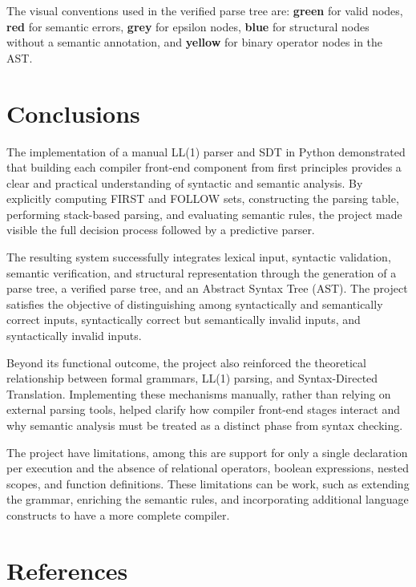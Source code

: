\documentclass[letterpaper,12pt,oneside]{article}
\begin{document}
The visual conventions used in the verified parse tree are:
\textbf{green} for valid nodes, \textbf{red} for semantic errors, \textbf{grey}
for epsilon nodes, \textbf{blue} for structural nodes without a semantic annotation,
and \textbf{yellow} for binary operator nodes in the AST.

\section{Conclusions}

The implementation of a manual LL(1) parser and SDT in Python demonstrated that
building each compiler front-end component from first principles provides a clear
and practical understanding of syntactic and semantic analysis. By explicitly
computing FIRST and FOLLOW sets, constructing the parsing table, performing
stack-based parsing, and evaluating semantic rules, the project made visible the
full decision process followed by a predictive parser.

The resulting system successfully integrates lexical input, syntactic validation,
semantic verification, and structural representation through the generation of a
parse tree, a verified parse tree, and an Abstract Syntax Tree (AST). The project satisfies the objective of distinguishing among syntactically
and semantically correct inputs, syntactically correct but semantically invalid
inputs, and syntactically invalid inputs.

Beyond its functional outcome, the project also reinforced the theoretical
relationship between formal grammars, LL(1) parsing, and Syntax-Directed
Translation. Implementing these mechanisms manually, rather than relying on
external parsing tools, helped clarify how compiler front-end stages interact and why semantic analysis must be treated as a distinct phase from syntax checking.

The project have limitations, among this are support for only a single declaration per execution and the absence of relational operators, boolean expressions, nested scopes, and function definitions. These limitations can be work, such as extending the grammar, enriching the semantic rules, and incorporating additional language constructs to have a more complete compiler.

\section{References}
\end{document}
